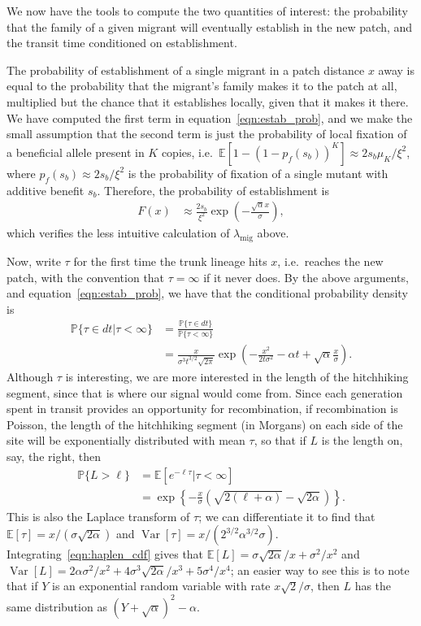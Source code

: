 \documentclass{article}
\DeclareMathOperator{\var}{Var}
\renewcommand{\P}{\mathbb{P}}
\newcommand{\E}{\mathbb{E}}
\newcommand{\migrate}{\lambda_\text{mig}}
\begin{document}
We now have the tools to compute the two quantities of interest:
the probability that the family of a given migrant will eventually establish in the new patch,
and the transit time conditioned on establishment.

The probability of establishment of a single migrant in a patch distance $x$ away
is equal to the probability that the migrant's family makes it to the patch at all,
multiplied but the chance that it establishes locally, given that it makes it there.
We have computed the first term in equation~\eqref{eqn:estab_prob},
and we make the small assumption that the second term is just the probability of local fixation
of a beneficial allele present in $K$ copies,
i.e.~$\E[1-(1-p_f(s_b))^K] \approx 2 s_b \mu_K/\xi^2$,
where $p_f(s_b) \approx 2s_b/\xi^2$ is the probability of fixation of a single mutant with additive benefit $s_b$.
Therefore, the probability of establishment is
\begin{align} \label{eqn:bp_prob_estab}
  F(x) &\approx \frac{2s_b}{\xi^2} \exp\left( - \frac{\sqrt{\alpha} x}{\sigma} \right) ,
\end{align}
which verifies the less intuitive calculation of $\migrate$ above.

Now, write $\tau$ for the first time the trunk lineage hits $x$, i.e.\ reaches the new patch,
with the convention that $\tau=\infty$ if it never does.
By the above arguments, and equation~\eqref{eqn:estab_prob}, we have that the conditional probability density is
\begin{align}
  \P\{\tau\in dt | \tau<\infty \} &= \frac{\P\{\tau \in dt\}}{\P\{\tau<\infty\}} \\
  &= \frac{x}{\sigma^3 t^{3/2}\sqrt{2\pi}} \exp\left(-\frac{x^2}{2t\sigma^2} -\alpha t + \sqrt{\alpha} \frac{x}{\sigma} \right) .
\end{align}
Although $\tau$ is interesting, we are more interested in the length of the hitchhiking segment,
since that is where our signal would come from.
Since each generation spent in transit provides an opportunity for recombination,
if recombination is Poisson, the length of the hitchhiking segment (in Morgans) on each side of the site will be exponentially distributed
with mean $\tau$, so that if $L$ is the length on, say, the right, then
\begin{align} \label{eqn:haplen_cdf}
\P\{L>\ell\} &= \E[e^{-\ell \tau}|\tau<\infty] \\
&= \exp\left\{{-\frac{x}{\sigma}\left(\sqrt{2(\ell+\alpha)} - \sqrt{2\alpha}\right)}\right\} .
\end{align}
This is also the Laplace transform of $\tau$;
we can differentiate it to find that $\E[\tau] = x/(\sigma\sqrt{2\alpha})$
and $\var[\tau] = x/( 2^{3/2}\alpha^{3/2}\sigma)$.
Integrating~\eqref{eqn:haplen_cdf} gives that 
$\E[L] = \sigma \sqrt{2\alpha}/x + \sigma^2/x^2$ and $\var[L] = 2\alpha\sigma^2/x^2 + 4 \sigma^3 \sqrt{2\alpha}/x^3 + 5 \sigma^4 / x^4$;
an easier way to see this is to note that if $Y$ is an exponential random variable with rate $x\sqrt{2}/\sigma$,
then $L$ has the same distribution as $(Y + \sqrt{\alpha})^2 - \alpha$.
\end{document}
